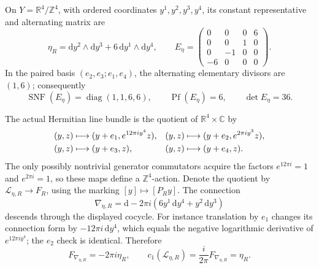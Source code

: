 On \(Y=\mathbb R^4/\mathbb Z^4\), with ordered coordinates
\(y^1,y^2,y^3,y^4\), its constant representative and alternating matrix are
\begin{equation}
 \eta_R=\mathrm dy^2\wedge\mathrm dy^3
       +6\,\mathrm dy^1\wedge\mathrm dy^4,
 \qquad
 E_\eta=
 \begin{pmatrix}
 0&0&0&6\\
 0&0&1&0\\
 0&-1&0&0\\
 -6&0&0&0
 \end{pmatrix}.
 \label{cusp-native-full-flux-form-matrix}
\end{equation}
In the paired basis \((e_2,e_3;e_1,e_4)\), the alternating elementary
divisors are \((1,6)\); consequently
\begin{equation}
 \operatorname{SNF}(E_\eta)=\operatorname{diag}(1,1,6,6),
 \qquad \operatorname{Pf}(E_\eta)=6,
 \qquad \det E_\eta=36.
 \label{cusp-native-full-flux-smith-pfaffian}
\end{equation}

The actual Hermitian line bundle is the quotient of
\(\mathbb R^4\times\mathbb C\) by
\begin{align}
 (y,z)&\longmapsto(y+e_1,e^{12\pi i y^4}z),&
 (y,z)&\longmapsto(y+e_2,e^{2\pi i y^3}z),
 \label{cusp-native-full-flux-cocycle}\\
 (y,z)&\longmapsto(y+e_3,z),&
 (y,z)&\longmapsto(y+e_4,z).
 \notag
\end{align}
The only possibly nontrivial generator commutators acquire the factors
\(e^{12\pi i}=1\) and \(e^{2\pi i}=1\), so these maps define a
\(\mathbb Z^4\)-action.  Denote the quotient by
\(\mathscr L_{\eta,R}\to F_R\), using the marking
\([y]\mapsto[P_Ry]\).  The connection
\begin{equation}
 \nabla_{\eta,R}
 =\mathrm d-2\pi i(6y^1\,\mathrm dy^4+y^2\,\mathrm dy^3)
 \label{cusp-native-full-flux-connection}
\end{equation}
descends through the displayed cocycle.  For instance translation by \(e_1\)
changes its connection form by \(-12\pi i\,\mathrm dy^4\), which equals the
negative logarithmic derivative of \(e^{12\pi i y^4}\); the \(e_2\) check is
identical.  Therefore
\begin{equation}
 F_{\nabla_{\eta,R}}=-2\pi i\eta_R,
 \qquad c_1(\mathscr L_{\eta,R})
 =\frac{i}{2\pi}F_{\nabla_{\eta,R}}=\eta_R.
 \label{cusp-native-full-flux-curvature}
\end{equation}

